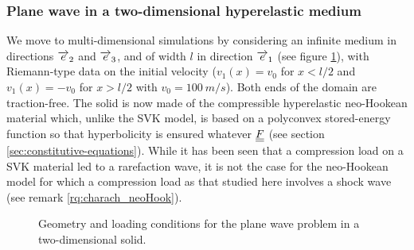 

\subsubsection*{Plane wave in a two-dimensional hyperelastic medium}
We move to multi-dimensional simulations by considering an infinite medium in directions ${\overrightarrow{e}}_2$ and ${\overrightarrow{e}}_3$, and of width $l$ in direction ${\overrightarrow{e}}_1$ (see figure \ref{fig:2dHEbar}), with Riemann-type data on the initial velocity ($v_1(x)=v_0$ for $x <l/2$ and $v_1(x)=-v_0$ for $x >l/2$ with $v_0=100 \: m/s$). Both ends of the domain are traction-free.
The solid is now made of the compressible hyperelastic neo-Hookean material which, unlike the SVK model, is based on a polyconvex stored-energy function so that hyperbolicity is ensured whatever ${\underline{\underline{F}}}$ (see section \ref{sec:constitutive-equations}).
While it has been seen that a compression load on a SVK material led to a rarefaction wave, it is not the case for the neo-Hookean model for which a compression load as that studied here involves a shock wave (see remark \ref{rq:charach_neoHook}).
\begin{figure}[h!]
  \centering
  
  \caption{Geometry and loading conditions for the plane wave problem in a two-dimensional solid.}
  \label{fig:2dHEbar}
\end{figure}

